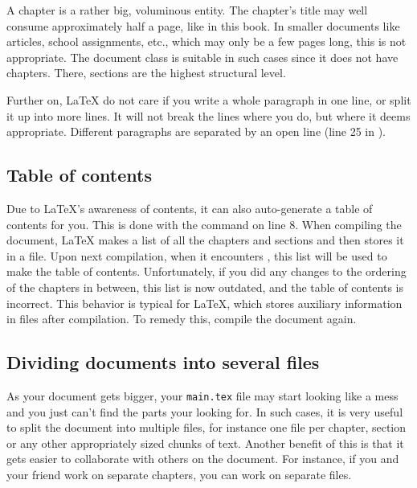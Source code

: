 {\begin{listing}[H]
	\inputminted{latex}{latex/structure.tex}
	\caption{A \LaTeX{} document with some structure and text}
	\label{lst:latex:structure}
\end{listing}

A chapter is a rather big, voluminous entity. The chapter's title may well consume approximately half a page, like in this book. In smaller documents like articles, school assignments, etc., which may only be a few pages long, this is not appropriate. The   document class is suitable in such cases since it does not have chapters. There, sections are the highest structural level.

Further on, \LaTeX{} do not care if you write a whole paragraph in one line, or split it up into more lines. It will not break the lines where you do, but where it deems appropriate. Different paragraphs are separated by an open line (line 25 in ). 

\subsection{Table of contents}
\index{\latexin{\tableofcontents}}
Due to \LaTeX{}'s awareness of contents, it can also auto-generate a table of contents for you. This is done with the \latexin{\tableofcontents} command on line 8. When compiling the document, \LaTeX{} makes a list of all the chapters and sections and then stores it in a file. Upon next compilation, when it encounters \latexin{\tableofcontents}, this list will be used to make the table of contents. Unfortunately, if you did any changes to the ordering of the chapters in between, this list is now outdated, and the table of contents is incorrect. This behavior is typical for \LaTeX{}, which stores auxiliary information in files after compilation. To remedy this, compile the document again.

\subsection{Dividing documents into several files}
As your document gets bigger, your \verb|main.tex| file may start looking like a mess and you just can't find the parts your looking for. In such cases, it is very useful to split the document into multiple files, for instance one file per chapter, section or any other appropriately sized chunks of text. Another benefit of this is that it gets easier to collaborate with others on the document. For instance, if you and your friend work on separate chapters, you can work on separate files.

}
